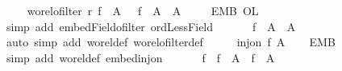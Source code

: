 \begin{isabellebody}
\ \ \isamarkupfalse%
\ {}{\isacharcolon}{\kern0pt}\ {\isachardoublequoteopen}wo{\isacharunderscore}{\kern0pt}rel{\isachardot}{\kern0pt}ofilter\ r{}\ {\isacharparenleft}{\kern0pt}f{}{}\ {\isacharbackquote}{\kern0pt}\ {\isacharquery}{\kern0pt}A{}{\isacharparenright}{\kern0pt}\ \ {\isasymand}\ f{}{}\ {\isacharbackquote}{\kern0pt}\ {\isacharquery}{\kern0pt}A{}\ {\isasymnoteq}\ {\isacharquery}{\kern0pt}A{}{\isachardoublequoteclose}\isanewline
\ \ \isamarkupfalse%
\ {}\ EMB{}{}\ OL{}{}\ \isamarkupfalse%
\ {\isacharparenleft}{\kern0pt}simp\ add{\isacharcolon}{\kern0pt}\ embed{\isacharunderscore}{\kern0pt}Field{\isacharunderscore}{\kern0pt}ofilter\ ordLess{\isacharunderscore}{\kern0pt}Field{\isacharparenright}{\kern0pt}\isanewline
\ \ \isanewline
\ \ \isamarkupfalse%
\ {\isachardoublequoteopen}f{}{}\ {\isacharbackquote}{\kern0pt}\ {\isacharquery}{\kern0pt}A{}\ {\isacharless}{\kern0pt}\ {\isacharquery}{\kern0pt}A{}{\isachardoublequoteclose}\isanewline
\ \ \isamarkupfalse%
\ {}\ {}\ \isamarkupfalse%
\ {\isacharparenleft}{\kern0pt}auto\ simp\ add{\isacharcolon}{\kern0pt}\ wo{\isacharunderscore}{\kern0pt}rel{\isacharunderscore}{\kern0pt}def\ wo{\isacharunderscore}{\kern0pt}rel{\isachardot}{\kern0pt}ofilter{\isacharunderscore}{\kern0pt}def{\isacharparenright}{\kern0pt}\isanewline
\ \ \isamarkupfalse%
\ \isamarkupfalse%
\ {\isachardoublequoteopen}inj{\isacharunderscore}{\kern0pt}on\ f{}{}\ {\isacharquery}{\kern0pt}A{}{\isachardoublequoteclose}\isanewline
\ \ \isamarkupfalse%
\ EMB{}{}\ {}\ \isamarkupfalse%
\ {\isacharparenleft}{\kern0pt}simp\ add{\isacharcolon}{\kern0pt}\ wo{\isacharunderscore}{\kern0pt}rel{\isacharunderscore}{\kern0pt}def\ embed{\isacharunderscore}{\kern0pt}inj{\isacharunderscore}{\kern0pt}on{\isacharparenright}{\kern0pt}\isanewline
\ \ \isamarkupfalse%
\isanewline
\ \ \isamarkupfalse%
\ {\isachardoublequoteopen}f{}{}\ {\isacharbackquote}{\kern0pt}\ {\isacharparenleft}{\kern0pt}f{}{}\ {\isacharbackquote}{\kern0pt}\ {\isacharquery}{\kern0pt}A{}{\isacharparenright}{\kern0pt}\ {\isacharless}{\kern0pt}\ f{}{}\ {\isacharbackquote}{\kern0pt}\ {\isacharquery}{\kern0pt}A{}{\isachardoublequoteclose}\ \isamarkupfalse%

\end{isabellebody}
